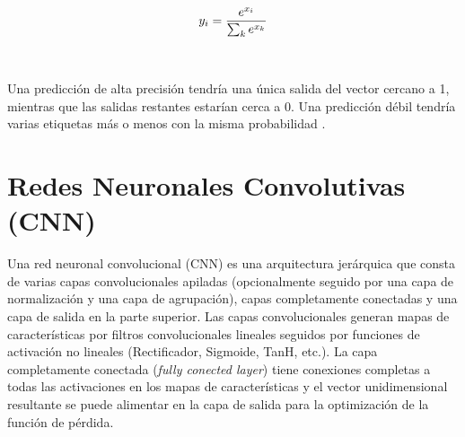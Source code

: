     \begin{equation}
        \centering
        y_i=\frac{e^{x_i}}{\sum_k e^{x_k}}
    \end{equation}
    \\\\
    Una predicción de alta precisión tendría una única salida del vector cercano a 1, mientras que las salidas restantes estarían cerca a 0. Una predicción débil tendría varias etiquetas más o menos con la misma probabilidad \cite{dlBook}.





\section{Redes Neuronales Convolutivas (CNN)}

Una red neuronal convolucional (CNN) es una arquitectura jerárquica \cite{LeCun} que consta de varias capas convolucionales apiladas (opcionalmente seguido por una capa de normalización y una capa de agrupación), capas completamente conectadas y una capa de salida en la parte superior. Las capas convolucionales generan mapas de características por filtros convolucionales lineales seguidos por funciones de activación no lineales (Rectificador, Sigmoide, TanH, etc.). La capa completamente conectada (\textit{fully conected layer}) tiene conexiones completas a todas las activaciones en los mapas de características y el vector unidimensional resultante se puede alimentar en la capa de salida para la optimización de la función de pérdida.

